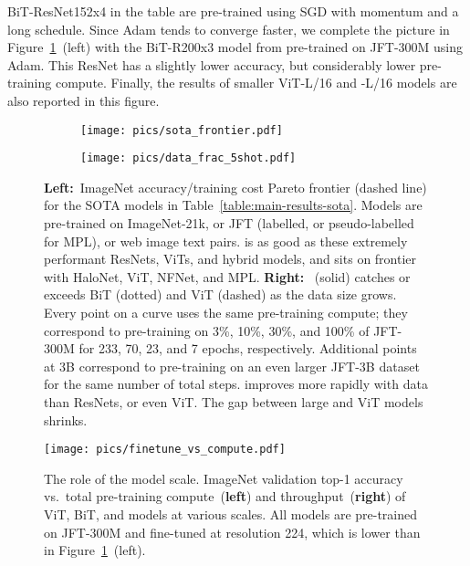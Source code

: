 BiT-ResNet152x4 in the table are pre-trained using SGD with momentum and a long schedule.
Since Adam tends to converge faster, we complete the picture in Figure~\ref{fig:main-sota-and-jft-fractions}~(left) with the BiT-R200x3 model from \citet{Dosovitskiy2021} pre-trained on JFT-300M using Adam.
This ResNet has a slightly lower accuracy, but considerably lower pre-training compute.
Finally, the results of smaller ViT-L/16 and \name{}-L/16 models are also reported in this figure.

\begin{figure}[tb]
\centering
\begin{subfigure}{.328\textwidth}
  \centering \texttt{[image: pics/sota\_frontier.pdf]}
\end{subfigure}\begin{subfigure}{.51\textwidth}
  \centering
  \texttt{[image: pics/data\_frac\_5shot.pdf]}
\end{subfigure}
\caption{
  {\bf Left:}~ImageNet accuracy/training cost Pareto frontier (dashed line) for the SOTA models 
  in
  Table~\ref{table:main-results-sota}.
  Models are pre-trained on ImageNet-21k, or JFT (labelled, or pseudo-labelled for MPL), or 
  web image text pairs.
  \name{} is as good as these extremely performant ResNets, ViTs, and hybrid models,
  and sits on frontier with HaloNet, ViT, NFNet, and MPL.
  {\bf Right:}~\name{} (solid) catches or exceeds BiT (dotted) and ViT (dashed) as the data size grows.
  Every point on a curve uses the same pre-training compute; they correspond to pre-training on 3\%, 10\%, 30\%, and 100\% of JFT-300M for 233, 70, 23, and 7 epochs, respectively.
  Additional points at 3B correspond to pre-training on an even larger JFT-3B dataset for the same number of total steps.
  \name{} improves more rapidly with data than ResNets, or even ViT.
  The gap between large \name{} and ViT models shrinks.
}
\vspace{-.1cm}
\label{fig:main-sota-and-jft-fractions}
\end{figure}

\begin{figure}[tb]
    \centering
    \texttt{[image: pics/finetune\_vs\_compute.pdf]}
  \caption{
  The role of the model scale.
  ImageNet validation top-1 accuracy vs.\ total pre-training compute~({\bf left}) and throughput~({\bf right}) of ViT, BiT, and \name{} models at various scales.
  All models are pre-trained on JFT-300M and fine-tuned at resolution 224, which is lower than in Figure~\ref{fig:main-sota-and-jft-fractions}~(left).}
  \label{fig:compute-frontier}
  \vspace{-.4cm}
\end{figure}

